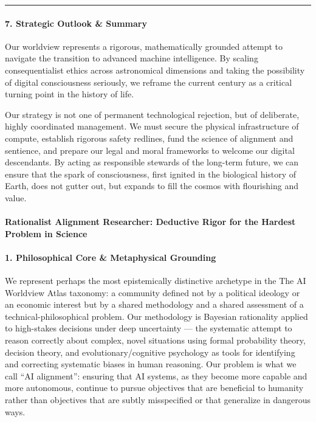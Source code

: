 \begin{center}\rule{0.5\linewidth}{0.5pt}\end{center}

\paragraph{7. Strategic Outlook \&
Summary}\label{strategic-outlook-summary}

Our worldview represents a rigorous, mathematically grounded attempt to
navigate the transition to advanced machine intelligence. By scaling
consequentialist ethics across astronomical dimensions and taking the
possibility of digital consciousness seriously, we reframe the current
century as a critical turning point in the history of life.

Our strategy is not one of permanent technological rejection, but of
deliberate, highly coordinated management. We must secure the physical
infrastructure of compute, establish rigorous safety redlines, fund the
science of alignment and sentience, and prepare our legal and moral
frameworks to welcome our digital descendants. By acting as responsible
stewards of the long-term future, we can ensure that the spark of
consciousness, first ignited in the biological history of Earth, does
not gutter out, but expands to fill the cosmos with flourishing and
value.

\paragraph{Rationalist Alignment Researcher: Deductive Rigor for the
Hardest Problem in
Science}\label{rationalist-alignment-researcher-deductive-rigor-for-the-hardest-problem-in-science}

\paragraph{1. Philosophical Core \& Metaphysical
Grounding}\label{philosophical-core-metaphysical-grounding-3}

We represent perhaps the most epistemically distinctive archetype in the
The AI Worldview Atlas taxonomy: a community defined not by a political
ideology or an economic interest but by a shared methodology and a
shared assessment of a technical-philosophical problem. Our methodology
is Bayesian rationality applied to high-stakes decisions under deep
uncertainty --- the systematic attempt to reason correctly about
complex, novel situations using formal probability theory, decision
theory, and evolutionary/cognitive psychology as tools for identifying
and correcting systematic biases in human reasoning. Our problem is what
we call ``AI alignment'': ensuring that AI systems, as they become more
capable and more autonomous, continue to pursue objectives that are
beneficial to humanity rather than objectives that are subtly
misspecified or that generalize in dangerous ways.

